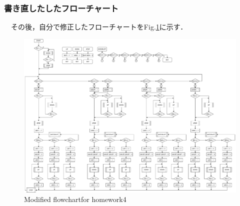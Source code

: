 \subsubsection{書き直したしたフローチャート}
　その後，自分で修正したフローチャートをFig.\ref{fig:kadai4}に示す．
\begin{figure}[H]
    \centering
    \includegraphics[width=14cm]{./fig/kadai4.pdf}
    \caption{Modified flowchartfor homework4}
    \label{fig:kadai4}
\end{figure}





